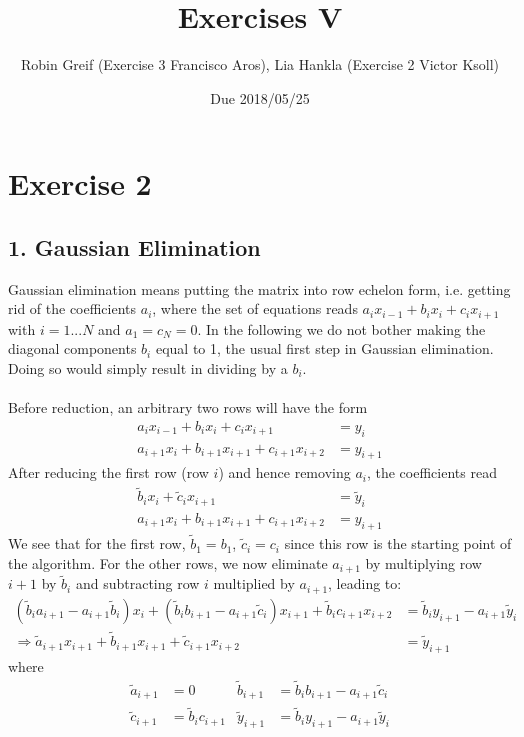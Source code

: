 \documentclass[12pt,a4paper,twoside]{article}
\title{Exercises V}
\author{Robin Greif (Exercise 3 Francisco Aros), Lia Hankla (Exercise 2 Victor Ksoll)}
\date{Due 2018/05/25}
\begin{document}
\maketitle

\section*{Exercise 2}
\subsection*{1. Gaussian Elimination}
Gaussian elimination means putting the matrix into row echelon form, i.e. getting rid of the coefficients $a_i$, where the set of equations reads $a_ix_{i-1}+b_ix_i+c_ix_{i+1}$ with $i=1...N$ and $a_1=c_N=0$. In the following we do not bother making the diagonal components $b_i$ equal to 1, the usual first step in Gaussian elimination. Doing so would simply result in dividing by a $b_i$. \\
\\
Before reduction, an arbitrary two rows will have the form
\begin{align*}
a_ix_{i-1}+b_ix_i+c_ix_{i+1}&=y_i\\
a_{i+1}x_i+b_{i+1}x_{i+1}+c_{i+1}x_{i+2}&=y_{i+1}
\end{align*}
After reducing the first row (row $i$) and hence removing $a_i$, the coefficients read
\begin{align}
\tilde b_ix_i+\tilde c_ix_{i+1}&=\tilde y_i \label{eq:bi1}\\
a_{i+1}x_i+b_{i+1}x_{i+1}+c_{i+1}x_{i+2}&=y_{i+1} \label{eq:bi2}
\end{align}
We see that for the first row, $\tilde b_1=b_1$, $\tilde c_i=c_i$ since this row is the starting point of the algorithm. For the other rows, we now eliminate $a_{i+1}$ by multiplying row $i+1$ by $\tilde b_i$ and subtracting row $i$ multiplied by $a_{i+1}$, leading to:
\begin{align*}
(\tilde b_i a_{i+1}-a_{i+1}\tilde b_i)x_i+(\tilde b_i b_{i+1}-a_{i+1}\tilde c_i)x_{i+1}+\tilde b_ic_{i+1}x_{i+2}&=\tilde b_iy_{i+1}-a_{i+1}\tilde y_i\\
\Rightarrow \tilde a_{i+1}x_{i+1}+\tilde b_{i+1} x_{i+1}+\tilde c_{i+1}x_{i+2} &= \tilde y_{i+1}
\end{align*}
where 
\begin{align*}
\tilde a_{i+1}&=0 & \tilde b_{i+1}&=\tilde b_ib_{i+1}-a_{i+1}\tilde c_i\\
\tilde c_{i+1}&=\tilde b_ic_{i+1} & \tilde y_{i+1}&=\tilde b_iy_{i+1}-a_{i+1}\tilde y_i
\end{align*}
\end{document}
